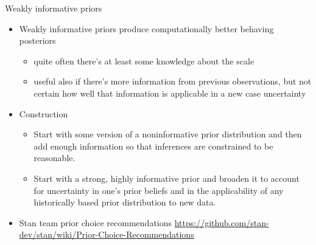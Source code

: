 \documentclass[english,t]{beamer}
\begin{document}
\begin{frame}{Weakly informative priors}

  \begin{itemize}
  \item Weakly informative priors produce computationally better
    behaving posteriors
    \begin{itemize}
    \item quite often there's at least some knowledge about the
      scale
    \item useful also if there's more information from previous
      observations, but not certain how well that information is
      applicable in a new case uncertainty
    \end{itemize}
    \pause
  \item Construction
    \begin{itemize}
    \item Start with some version of a noninformative prior distribution and then add enough
      information so that inferences are constrained to be reasonable.
    \item Start with a strong, highly informative prior and broaden it to account for uncertainty
      in one's prior beliefs and in the applicability of any historically based prior distribution
      to new data.
    \end{itemize}
  \item Stan team prior choice recommendations \url{https://github.com/stan-dev/stan/wiki/Prior-Choice-Recommendations}
  \end{itemize}

\end{frame}
\end{document}
